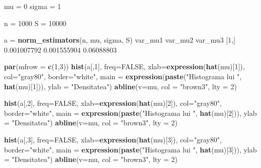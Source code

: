 \documentclass[]{article}
\newenvironment{Shaded}{\begin{snugshade}}{\end{snugshade}}
\newcommand{\KeywordTok}[1]{\textcolor[rgb]{0.13,0.29,0.53}{\textbf{#1}}}
\newcommand{\DataTypeTok}[1]{\textcolor[rgb]{0.13,0.29,0.53}{#1}}
\newcommand{\DecValTok}[1]{\textcolor[rgb]{0.00,0.00,0.81}{#1}}
\newcommand{\FloatTok}[1]{\textcolor[rgb]{0.00,0.00,0.81}{#1}}
\newcommand{\StringTok}[1]{\textcolor[rgb]{0.31,0.60,0.02}{#1}}
\newcommand{\OtherTok}[1]{\textcolor[rgb]{0.56,0.35,0.01}{#1}}
\newcommand{\NormalTok}[1]{#1}
\begin{document}
\begin{Shaded}
\begin{Highlighting}[]
\NormalTok{mu =}\StringTok{ }\DecValTok{0}
\NormalTok{sigma =}\StringTok{ }\DecValTok{1}

\NormalTok{n =}\StringTok{ }\DecValTok{1000}
\NormalTok{S =}\StringTok{ }\DecValTok{10000}

\NormalTok{a =}\StringTok{ }\KeywordTok{norm_estimators}\NormalTok{(n, mu, sigma, S)}
\NormalTok{         var_mu1     var_mu2    var_mu3}
\NormalTok{[}\DecValTok{1}\NormalTok{,] }\FloatTok{0.001007792} \FloatTok{0.001555904} \FloatTok{0.06088803}

\KeywordTok{par}\NormalTok{(}\DataTypeTok{mfrow =} \KeywordTok{c}\NormalTok{(}\DecValTok{1}\NormalTok{,}\DecValTok{3}\NormalTok{))}
\KeywordTok{hist}\NormalTok{(a[,}\DecValTok{1}\NormalTok{], }\DataTypeTok{freq=}\OtherTok{FALSE}\NormalTok{, }\DataTypeTok{xlab=}\KeywordTok{expression}\NormalTok{(}\KeywordTok{hat}\NormalTok{(mu)[}\DecValTok{1}\NormalTok{]), }
     \DataTypeTok{col=}\StringTok{"gray80"}\NormalTok{, }\DataTypeTok{border=}\StringTok{"white"}\NormalTok{, }
     \DataTypeTok{main =} \KeywordTok{expression}\NormalTok{(}\KeywordTok{paste}\NormalTok{(}\StringTok{"Histograma lui "}\NormalTok{, }\KeywordTok{hat}\NormalTok{(mu)[}\DecValTok{1}\NormalTok{])),}
     \DataTypeTok{ylab =} \StringTok{"Densitatea"}\NormalTok{)}
\KeywordTok{abline}\NormalTok{(}\DataTypeTok{v=}\NormalTok{mu, }\DataTypeTok{col =} \StringTok{"brown3"}\NormalTok{, }\DataTypeTok{lty =} \DecValTok{2}\NormalTok{)}

\KeywordTok{hist}\NormalTok{(a[,}\DecValTok{2}\NormalTok{], }\DataTypeTok{freq=}\OtherTok{FALSE}\NormalTok{, }\DataTypeTok{xlab=}\KeywordTok{expression}\NormalTok{(}\KeywordTok{hat}\NormalTok{(mu)[}\DecValTok{2}\NormalTok{]), }
     \DataTypeTok{col=}\StringTok{"gray80"}\NormalTok{, }\DataTypeTok{border=}\StringTok{"white"}\NormalTok{,}
     \DataTypeTok{main =} \KeywordTok{expression}\NormalTok{(}\KeywordTok{paste}\NormalTok{(}\StringTok{"Histograma lui "}\NormalTok{, }\KeywordTok{hat}\NormalTok{(mu)[}\DecValTok{2}\NormalTok{])),}
     \DataTypeTok{ylab =} \StringTok{"Densitatea"}\NormalTok{)}
\KeywordTok{abline}\NormalTok{(}\DataTypeTok{v=}\NormalTok{mu, }\DataTypeTok{col =} \StringTok{"brown3"}\NormalTok{, }\DataTypeTok{lty =} \DecValTok{2}\NormalTok{)}

\KeywordTok{hist}\NormalTok{(a[,}\DecValTok{3}\NormalTok{], }\DataTypeTok{freq=}\OtherTok{FALSE}\NormalTok{, }\DataTypeTok{xlab=}\KeywordTok{expression}\NormalTok{(}\KeywordTok{hat}\NormalTok{(mu)[}\DecValTok{3}\NormalTok{]), }
     \DataTypeTok{col=}\StringTok{"gray80"}\NormalTok{, }\DataTypeTok{border=}\StringTok{"white"}\NormalTok{,}
     \DataTypeTok{main =} \KeywordTok{expression}\NormalTok{(}\KeywordTok{paste}\NormalTok{(}\StringTok{"Histograma lui "}\NormalTok{, }\KeywordTok{hat}\NormalTok{(mu)[}\DecValTok{3}\NormalTok{])),}
     \DataTypeTok{ylab =} \StringTok{"Densitatea"}\NormalTok{)}
\KeywordTok{abline}\NormalTok{(}\DataTypeTok{v=}\NormalTok{mu, }\DataTypeTok{col =} \StringTok{"brown3"}\NormalTok{, }\DataTypeTok{lty =} \DecValTok{2}\NormalTok{)}
\end{Highlighting}
\end{Shaded}
\end{document}
